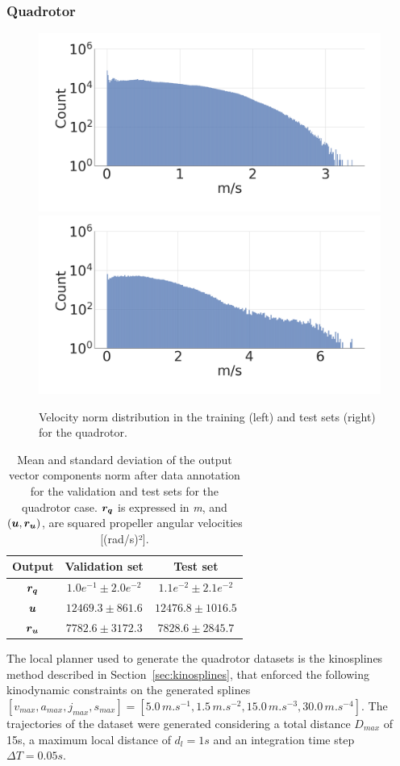 \subsubsection{Quadrotor}\label{sec:dataset_quad}

\begin{figure} [t]
    \centering
    \includegraphics[width=0.49\linewidth]{figures/learning_quadrotor/vnorm_val2.png}
    \includegraphics[width=0.49\linewidth]{figures/learning_quadrotor/vnorm_test.png}
    \caption{Velocity norm distribution in the training (left) and test sets (right) for the quadrotor.}%
    \label{fig: valvstest}%
\end{figure}

\begin{table}[t]
    \centering
    \begin{tabular}{ | c | c || c |}
    \hline
      \textbf{Output}  & \textbf{Validation set}  & \textbf{Test set} \\ \hline
    $\boldsymbol{r_q}$ & $1.0e^{-1} \pm 2.0e^{-2}$ & $1.1e^{-2} \pm 2.1e^{-2}$ \\ \hline
    $\boldsymbol{u}$ & $12469.3 \pm 861.6$ & $12476.8 \pm 1016.5$ \\ \hline
    $\boldsymbol{r_u}$ & $7782.6 \pm 3172.3$ & $7828.6 \pm 2845.7$ \\ \hline
\end{tabular}
\caption{
Mean and standard deviation of the output vector components norm after data annotation for the validation and test sets for the quadrotor case.
$\boldsymbol{r_q}$ is expressed in \emph{m}, and $(\boldsymbol{u}, \boldsymbol{r_u})$, are squared propeller angular velocities [(rad/s)²].}
 \label{tab:datas_stats}
\end{table}

The local planner used to generate the quadrotor datasets is the kinosplines method described in Section~\ref{sec:kinosplines}, that enforced the following kinodynamic constraints on the generated splines $[v_{max}, a_{max}, j_{max}, s_{max}] = [5.0 \, m.s^{-1}, \allowbreak 1.5 \, m.s^{-2}, \allowbreak 15.0 \, m.s^{-3}, \allowbreak 30.0 \, m.s^{-4}]$. 
The trajectories of the dataset were generated considering a total distance $D_{max}$ of 15s, a maximum local distance of $d_l = 1s$ and an integration time step $\Delta T = 0.05s$. 

